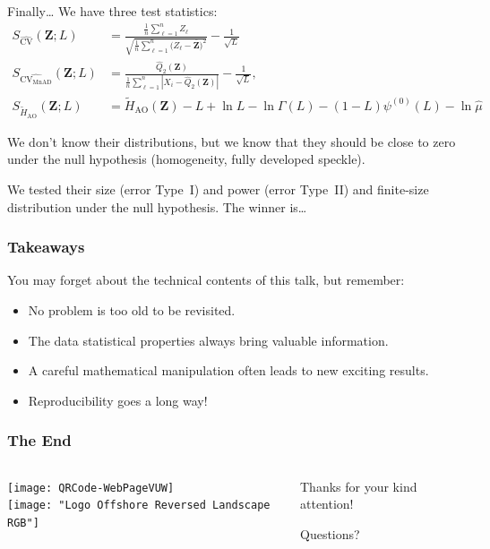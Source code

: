 \documentclass[table,aspectratio=169]{beamer}
\begin{document}
\begin{frame}{Finally\dots}
	We have three test statistics:
	\begin{align*}
		S_{\widehat{\text{CV}}}(\bm Z;L) &= \frac{\frac1n \sum_{\ell=1}^n Z_\ell}{\sqrt{\frac1n \sum_{\ell=1}^n \big(Z_\ell-\overline{\bm Z}\big)^2}} - \frac1{\sqrt{L}} \\
		S_{\widehat{\text{CV}_{\text{MnAD}}}} (\bm Z;L) &= \frac{\widehat{Q}_2(\bm Z)}{\frac1n \sum_{\ell=1}^n|X_i-\widehat{Q}_2(\bm Z)|}-\frac1{\sqrt{L}},\\
		S_{\widetilde{H}_{\text{AO}}}(\bm{Z}; L) & = \widetilde{H}_{\text{AO}}(\bm Z) - L + \ln L - \ln\Gamma(L) - (1-L)\psi^{(0)}(L) - \ln \widehat{\mu}
	\end{align*}
	
We don't know their distributions, but we know that they should be close to zero under the null hypothesis (homogeneity, fully developed speckle).

We tested their size (error Type~I) and power (error Type~II) and finite-size distribution under the null hypothesis.
\alert{The winner is\dots}
\end{frame}

\begin{frame}[standout]
\frametitle{Takeaways}
You may forget about the technical contents of this talk, but remember:
\begin{itemize}[<+->]
	\item No problem is too old to be revisited.
	\item The data statistical properties always bring valuable information.
	\item A careful mathematical manipulation often leads to new exciting results.
	\item Reproducibility goes a long way!
\end{itemize}
\end{frame}

\begin{frame}

 	
\end{frame}

\begin{frame}[standout]
\frametitle{The End}
\begin{columns}
	\begin{column}{.4\linewidth}
		\centering
		\texttt{[image: QRCode-WebPageVUW]}\\	\texttt{[image: "Logo Offshore Reversed Landscape RGB"]}
	\end{column}
	\begin{column}{.6\linewidth}
		Thanks for your kind attention!
		
		Questions?
	\end{column}
\end{columns}
\end{frame}
\end{document}
